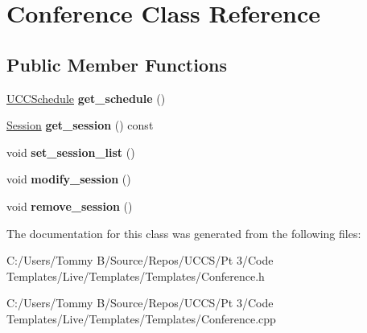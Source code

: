 \hypertarget{class_conference}{}\section{Conference Class Reference}
\label{class_conference}
\subsection*{Public Member Functions}
\begin{DoxyCompactItemize}
\item 
\mbox{\label{class_conference_ab4667a341d3f98444970e2a5811f8a63}} 
\hyperlink{class_u_c_c_schedule}{U\+C\+C\+Schedule} {\bfseries get\+\_\+schedule} ()
\item 
\mbox{\label{class_conference_abf28ab338c4a4fcded4f037d224877c1}} 
\hyperlink{class_session}{Session} {\bfseries get\+\_\+session} () const
\item 
\mbox{\label{class_conference_a8f3de8d7e4d29a19c8d5b4a65d3d1d56}} 
void {\bfseries set\+\_\+session\+\_\+list} ()
\item 
\mbox{\label{class_conference_a6eb20df08e584078440027ef6a8fecfa}} 
void {\bfseries modify\+\_\+session} ()
\item 
\mbox{\label{class_conference_add14475c0dae9c913a7475c80062582c}} 
void {\bfseries remove\+\_\+session} ()
\end{DoxyCompactItemize}


The documentation for this class was generated from the following files\+:\begin{DoxyCompactItemize}
\item 
C\+:/\+Users/\+Tommy B/\+Source/\+Repos/\+U\+C\+C\+S/\+Pt 3/\+Code Templates/\+Live/\+Templates/\+Templates/Conference.\+h\item 
C\+:/\+Users/\+Tommy B/\+Source/\+Repos/\+U\+C\+C\+S/\+Pt 3/\+Code Templates/\+Live/\+Templates/\+Templates/Conference.\+cpp\end{DoxyCompactItemize}
